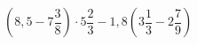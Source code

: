 \begin{ex}[type=calculate]
	\begin{condition}
		\( \left( 8,5-7\dfrac{3}{8} \right)\cdot5\dfrac{2}{3}-1,8\left( 3\dfrac{1}{3}-2\dfrac{7}{9} \right) \)
	\end{condition}
\end{ex}